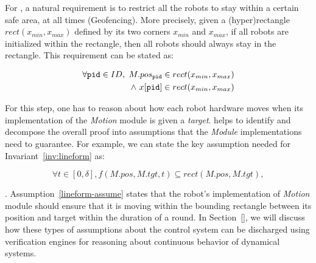 For \LineForm, a natural requirement is to restrict all the robots to stay within a certain safe area, at all times (Geofencing).
More precisely, given a (hyper)rectangle $\mathit{rect}(x_{min}, x_{max})$ defined by its two corners $x_{min}$ and $x_{max}$,
if all robots are initialized within the rectangle, then all robots should always stay in the rectangle. This requirement can be stated as:
\begin{invariant}
\label{inv:lineform}
%
\[
\begin{split}
    \forall \texttt{pid} \in ID,\ M.pos_{\texttt{pid}} \in rect(x_{min}, x_{max}) \\
    \land\ x[\texttt{pid}] \in rect(x_{min}, x_{max})
\end{split}
\]
\end{invariant}


For this step, one has to reason about how each robot hardware moves when its implementation of the \emph{Motion} module is given a \emph{target}. \lgname helps to identify and decompose the overall proof into  assumptions that the \emph{Module} implementations need to guarantee. For example,  we can state the key assumption needed for Invariant~\ref{inv:lineform} as: 
\begin{assumption}
\label{lineform-assume}
\[
\forall t \in [0, \delta], f(M.pos, M.tgt, t) \subseteq rect(M.pos, M.tgt),
\]
\end{assumption}
.
Assumption~\ref{lineform-assume} states that the robot's implementation of \emph{Motion} module should ensure that it is moving within the bounding rectangle between its position and target within the duration of a round.
%
%
In Section~\ref{}, we will discuss how these types of assumptions about the control system can be discharged using verification engines for reasoning about continuous behavior of dynamical systems.

